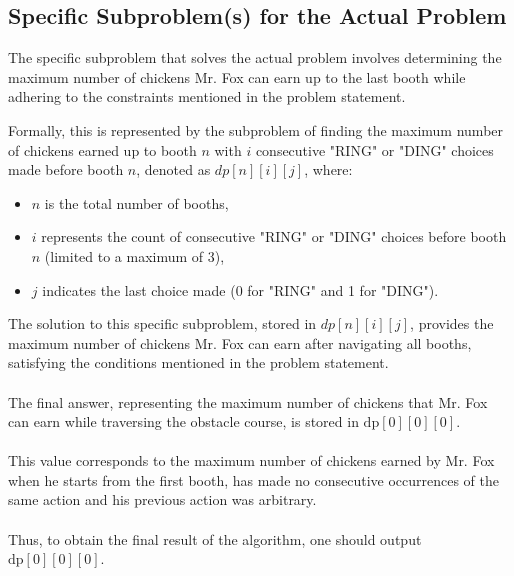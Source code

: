 \documentclass{article}
\begin{document}
\subsection*{\Large {Specific Subproblem(s) for the Actual Problem}}
The specific subproblem that solves the actual problem involves determining the maximum number of chickens Mr. Fox can earn up to the last booth while adhering to the constraints mentioned in the problem statement. 

Formally, this is represented by the subproblem of finding the maximum number of chickens earned up to booth $n$ with $i$ consecutive "RING" or "DING" choices made before booth $n$, denoted as $dp[n][i][j]$, where:
\begin{itemize}
    \item $n$ is the total number of booths,
    \item $i$ represents the count of consecutive "RING" or "DING" choices before booth $n$ (limited to a maximum of 3),
    \item $j$ indicates the last choice made (0 for "RING" and 1 for "DING").
\end{itemize}

The solution to this specific subproblem, stored in $dp[n][i][j]$, provides the maximum number of chickens Mr. Fox can earn after navigating all booths, satisfying the conditions mentioned in the problem statement.
\\\\
The final answer, representing the maximum number of chickens that Mr. Fox can earn while traversing the obstacle course, is stored in \(\text{dp}[0][0][0]\).
\\\\
This value corresponds to the maximum number of chickens earned by Mr. Fox when he starts from the first booth, has made no consecutive occurrences of the same action and his previous action was arbitrary.
\\\\
Thus, to obtain the final result of the algorithm, one should output \(\text{dp}[0][0][0]\).
\end{document}
